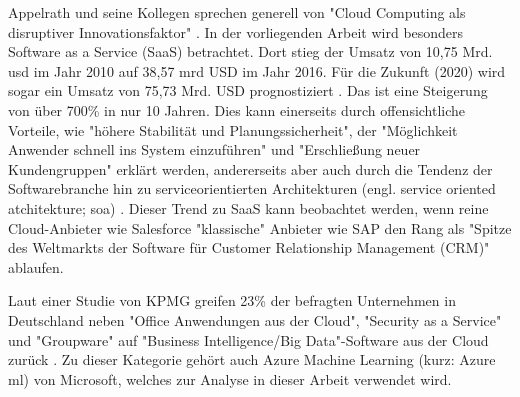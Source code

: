 Appelrath und seine Kollegen sprechen generell von "Cloud Computing als disruptiver Innovationsfaktor" \citep[S.~23]{appelrath_future_2014-1}. In der vorliegenden Arbeit wird besonders Software as a Service (SaaS) betrachtet. Dort stieg der Umsatz von 10,75 Mrd. \gls{usd} im Jahr 2010 auf 38,57 \gls{mrd} USD im Jahr 2016. Für die Zukunft (2020) wird sogar ein Umsatz von 75,73 Mrd. USD prognostiziert \citep{gartner_umsatz_2017}. Das ist eine Steigerung von über 700\% in nur 10 Jahren. Dies kann einerseits durch offensichtliche Vorteile, wie "höhere Stabilität und Planungssicherheit", der "Möglichkeit Anwender schnell ins System einzuführen" und "Erschließung neuer Kundengruppen" \citep{fraunhofer_vorteile_2010} erklärt werden, andererseits aber auch durch die Tendenz der Softwarebranche hin zu serviceorientierten Architekturen (engl. service oriented atchitekture; \gls{soa}) \citep[S.~22]{appelrath_future_2014-1}. Dieser Trend zu SaaS kann beobachtet werden, wenn reine Cloud-Anbieter wie Salesforce "klassische" Anbieter wie SAP den Rang als "Spitze des Weltmarkts der Software für Customer Relationship Management (CRM)" \citep{fritsch_salesforce.com_2013} ablaufen.\par
Laut einer Studie von KPMG greifen 23\% der befragten Unternehmen in Deutschland neben "Office Anwendungen aus der Cloud", "Security as a Service" und "Groupware" auf "Business Intelligence/Big Data"-Software aus der Cloud zurück \citep{bitkom_welche_2017}. Zu dieser Kategorie gehört auch Azure Machine Learning (kurz: Azure \gls{ml}) von Microsoft, welches zur Analyse in dieser Arbeit verwendet wird.